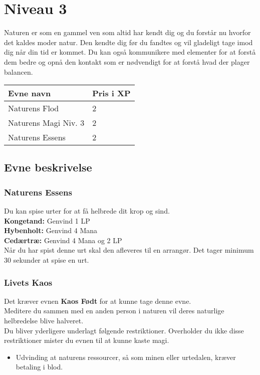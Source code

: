 \chapter{Niveau 3}

Naturen er som en gammel ven som altid har kendt dig og du forstår nu hvorfor det kaldes moder natur. Den kendte dig før du fandtes og vil gladeligt tage imod dig når din tid er kommet.
Du kan også kommunikere med elementer for at forstå dem bedre og opnå den kontakt som er nødvendigt for at forstå hvad der plager balancen.


\begin{table}[H]
    \centering
    \begin{tabular}{|p{}|p{}|}
    \rowcolor{cerulean!80}\hline
        Evne navn & Pris i XP \\\hline
        Naturens Flod & 2 \\\hline
        Naturens Magi Niv. 3 & 2\\\hline
        Naturens Essens & 2 \\\hline
    \end{tabular}
\end{table}
\section{Evne beskrivelse}

\subsection{Naturens Essens}
Du kan spise urter for at få helbrede dit krop og sind.\\
\textbf{Kongetand:} Genvind 1 LP\\
\textbf{Hybenholt:} Genvind 4 Mana\\
\textbf{Cedærtræ:} Genvind 4 Mana og 2 LP\\
Når du har spist denne urt skal den afleveres til en arrangør. Det tager minimum 30 sekunder at spise en urt.

\subsection{Livets Kaos}
Det kræver evnen \textbf{Kaos Født} for at kunne tage denne evne.\\
Meditere du sammen med en anden person i naturen vil deres naturlige helbredelse blive halveret.\\
Du bliver yderligere underlagt følgende restriktioner. Overholder du ikke disse restriktioner mister du evnen til at kunne kaste magi.
\begin{itemize}
    \item Udvinding at naturens ressourcer, så som minen eller urtedalen, kræver betaling i blod.
\end{itemize}

